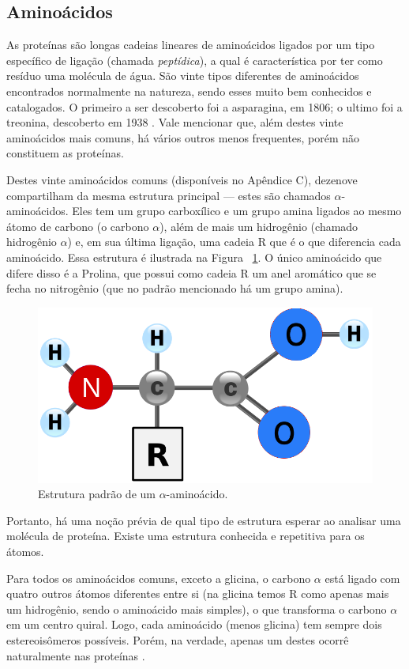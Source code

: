 \documentclass[a4paper,12pt]{article}
\begin{document}
	\subsection{Aminoácidos}
	As proteínas são longas cadeias lineares de aminoácidos ligados por um tipo específico de ligação (chamada \textit{peptídica}), a qual é característica por ter como resíduo uma molécula de água. São vinte tipos diferentes de aminoácidos encontrados normalmente na natureza, sendo esses muito bem conhecidos e catalogados. O primeiro a ser descoberto foi a asparagina, em 1806; o ultimo foi a treonina, descoberto em 1938 \cite{bioquimicaLehninger}. Vale mencionar que, além destes vinte aminoácidos mais comuns, há vários outros menos frequentes, porém não constituem as proteínas.
	
	Destes vinte aminoácidos comuns (disponíveis no Apêndice C), dezenove compartilham da mesma estrutura principal \cite{fidalgotese} --- estes são chamados $\alpha$-aminoácidos. Eles tem um grupo carboxílico e um grupo amina ligados ao mesmo átomo de carbono (o carbono $\alpha$), além de mais um hidrogênio (chamado hidrogênio $\alpha$) e, em sua última ligação, uma cadeia R que é o que diferencia cada aminoácido. Essa estrutura é ilustrada na Figura ~\ref{fig:amino}. O único aminoácido que difere disso é a Prolina, que possui como cadeia R um anel aromático que se fecha no nitrogênio (que no padrão mencionado há um grupo amina).
	
	\begin{figure}[H]
		\begin{center}
			\includegraphics[width=0.35\linewidth]{amino.png}
		\end{center}
		\caption{Estrutura padrão de um $\alpha$-aminoácido.}
		\label{fig:amino}
	\end{figure}
	
	Portanto, há uma noção prévia de qual tipo de estrutura esperar ao analisar uma molécula de proteína. Existe uma estrutura conhecida e repetitiva para os átomos.
	
	Para todos os aminoácidos comuns, exceto a glicina, o carbono $\alpha$ está ligado com quatro outros átomos diferentes entre si (na glicina temos R como apenas mais um hidrogênio, sendo o aminoácido mais simples), o que transforma o carbono $\alpha$ em um centro quiral. Logo, cada aminoácido (menos glicina) tem sempre dois estereoisômeros possíveis. Porém, na verdade, apenas um destes ocorrê naturalmente nas proteínas \cite{bioquimicaLehninger}.
	
\end{document}
